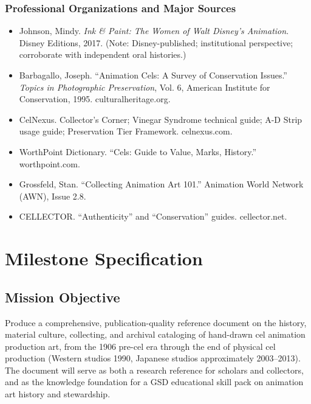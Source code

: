 \documentclass[11pt,letterpaper]{article}
\newcommand{\stageheader}[2]{%
  \noindent\colorbox{#2}{\makebox[\textwidth][l]{%
    \textcolor{white}{\bfseries\sffamily\hspace{6pt}#1\hspace{6pt}}}}%
  \vspace{0.5em}\par%
}
\begin{document}
\subsubsection{Professional Organizations and Major Sources}
\begin{itemize}
  \item Johnson, Mindy. \textit{Ink \& Paint: The Women of Walt Disney's Animation}. Disney Editions, 2017. (Note: Disney-published; institutional perspective; corroborate with independent oral histories.)
  \item Barbagallo, Joseph. ``Animation Cels: A Survey of Conservation Issues.'' \textit{Topics in Photographic Preservation}, Vol. 6, American Institute for Conservation, 1995. culturalheritage.org.
  \item CelNexus. Collector's Corner; Vinegar Syndrome technical guide; A-D Strip usage guide; Preservation Tier Framework. celnexus.com.
  \item WorthPoint Dictionary. ``Cels: Guide to Value, Marks, History.'' worthpoint.com.
  \item Grossfeld, Stan. ``Collecting Animation Art 101.'' Animation World Network (AWN), Issue 2.8.
  \item CELLECTOR. ``Authenticity'' and ``Conservation'' guides. cellector.net.
\end{itemize}

\newpage

\stageheader{STAGE 3 --- MISSION PACKAGE}{tertiary}

\section{Milestone Specification}

\subsection{Mission Objective}

Produce a comprehensive, publication-quality reference document on the history, material culture, collecting, and archival cataloging of hand-drawn cel animation production art, from the 1906 pre-cel era through the end of physical cel production (Western studios 1990, Japanese studios approximately 2003--2013). The document will serve as both a research reference for scholars and collectors, and as the knowledge foundation for a GSD educational skill pack on animation art history and stewardship.
\end{document}
